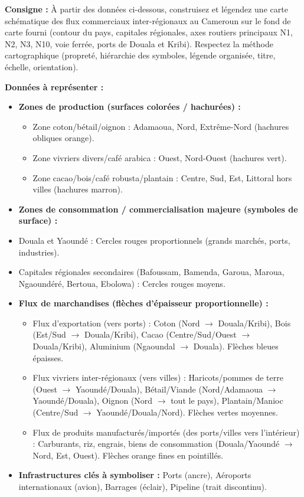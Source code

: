 \documentclass[11pt]{article}
\begin{document}
\begin{exercice}
\textbf{Consigne :} À partir des données ci-dessous, construisez et légendez une carte schématique des flux commerciaux inter-régionaux au Cameroun sur le fond de carte fourni (contour du pays, capitales régionales, axes routiers principaux N1, N2, N3, N10, voie ferrée, ports de Douala et Kribi). Respectez la méthode cartographique (propreté, hiérarchie des symboles, légende organisée, titre, échelle, orientation).

\textbf{Données à représenter :}
\begin{itemize}
    \item \textbf{Zones de production (surfaces colorées / hachurées) :}
    \begin{itemize}
        \item Zone coton/bétail/oignon : Adamaoua, Nord, Extrême-Nord (hachures obliques \textcolor{poporange}{orange}).
        \item Zone vivriers divers/café arabica : Ouest, Nord-Ouest (hachures \textcolor{popgreen}{vert}).
        \item Zone cacao/bois/café robusta/plantain : Centre, Sud, Est, Littoral hors villes (hachures \textcolor{poporange!70!popdark}{marron}).
    \end{itemize}
    \item \textbf{Zones de consommation / commercialisation majeure (symboles de surface) :}
    \item Douala et Yaoundé : Cercles rouges proportionnels (grands marchés, ports, industries).
    \item Capitales régionales secondaires (Bafoussam, Bamenda, Garoua, Maroua, Ngaoundéré, Bertoua, Ebolowa) : Cercles rouges moyens.
    \item \textbf{Flux de marchandises (flèches d'épaisseur proportionnelle) :}
    \begin{itemize}
        \item Flux d'exportation (vers ports) : Coton (Nord $\rightarrow$ Douala/Kribi), Bois (Est/Sud $\rightarrow$ Douala/Kribi), Cacao (Centre/Sud/Ouest $\rightarrow$ Douala/Kribi), Aluminium (Ngaoundal $\rightarrow$ Douala). Flèches \textcolor{popblue}{bleues} épaisses.
        \item Flux vivriers inter-régionaux (vers villes) : Haricots/pommes de terre (Ouest $\rightarrow$ Yaoundé/Douala), Bétail/Viande (Nord/Adamaoua $\rightarrow$ Yaoundé/Douala), Oignon (Nord $\rightarrow$ tout le pays), Plantain/Manioc (Centre/Sud $\rightarrow$ Yaoundé/Douala/Nord). Flèches \textcolor{popgreen}{vertes} moyennes.
        \item Flux de produits manufacturés/importés (des ports/villes vers l'intérieur) : Carburants, riz, engrais, biens de consommation (Douala/Yaoundé $\rightarrow$ Nord, Est, Ouest). Flèches \textcolor{poporange}{orange} fines en pointillés.
    \end{itemize}
    \item \textbf{Infrastructures clés à symboliser :} Ports (ancre), Aéroports internationaux (avion), Barrages (éclair), Pipeline (trait discontinu).
\end{itemize}


\end{exercice}
\end{document}
